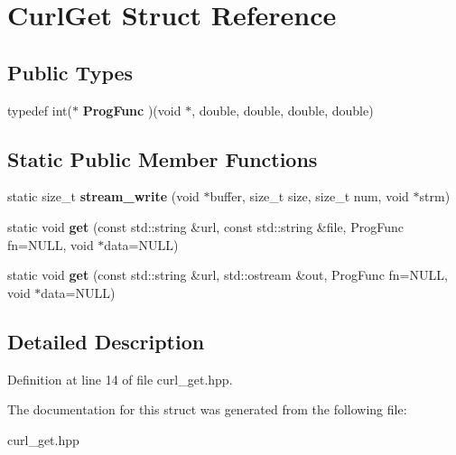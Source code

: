 \hypertarget{struct_curl_get}{\section{Curl\-Get Struct Reference}
\label{struct_curl_get}
}
\subsection*{Public Types}
\begin{DoxyCompactItemize}
\item 
\hypertarget{struct_curl_get_adc0c9ad9ff74214b474d1ca7856d8a2e}{typedef int($\ast$ {\bfseries Prog\-Func} )(void $\ast$, double, double, double, double)}\label{struct_curl_get_adc0c9ad9ff74214b474d1ca7856d8a2e}

\end{DoxyCompactItemize}
\subsection*{Static Public Member Functions}
\begin{DoxyCompactItemize}
\item 
\hypertarget{struct_curl_get_ac5f276dc342174dbf8b90e1abbc01afb}{static size\-\_\-t {\bfseries stream\-\_\-write} (void $\ast$buffer, size\-\_\-t size, size\-\_\-t num, void $\ast$strm)}\label{struct_curl_get_ac5f276dc342174dbf8b90e1abbc01afb}

\item 
\hypertarget{struct_curl_get_a00d4b38041a02b48d9a81c3eab125c00}{static void {\bfseries get} (const std\-::string \&url, const std\-::string \&file, Prog\-Func fn=N\-U\-L\-L, void $\ast$data=N\-U\-L\-L)}\label{struct_curl_get_a00d4b38041a02b48d9a81c3eab125c00}

\item 
\hypertarget{struct_curl_get_a624fe51e5dc40c0c23098ea6c52595c8}{static void {\bfseries get} (const std\-::string \&url, std\-::ostream \&out, Prog\-Func fn=N\-U\-L\-L, void $\ast$data=N\-U\-L\-L)}\label{struct_curl_get_a624fe51e5dc40c0c23098ea6c52595c8}

\end{DoxyCompactItemize}


\subsection{Detailed Description}


Definition at line 14 of file curl\-\_\-get.\-hpp.



The documentation for this struct was generated from the following file\-:\begin{DoxyCompactItemize}
\item 
curl\-\_\-get.\-hpp\end{DoxyCompactItemize}
